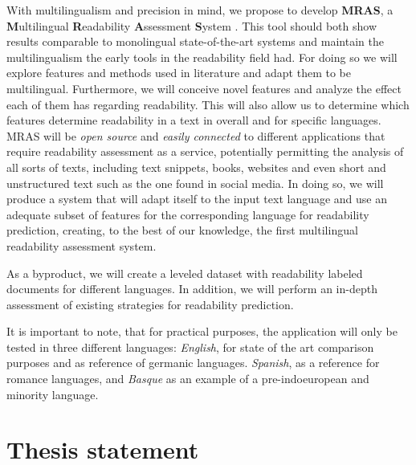 \documentclass[12pt]{article}
\begin{document}
With multilingualism and precision in mind, we propose to develop \textbf{MRAS}, a \textbf{M}ultilingual \textbf{R}eadability \textbf{A}ssessment \textbf{S}ystem . This tool should both show results comparable to monolingual state-of-the-art systems  and  maintain the multilingualism the early tools in the readability field had. For doing so we will explore features and methods used in literature and adapt them to be multilingual. Furthermore, we will conceive novel features and analyze the effect each of them has regarding readability. This will also allow us to determine which features determine readability in a text in overall and for specific languages. MRAS will be \textit{open source} and \textit{easily connected} to different applications that require readability assessment as a service, potentially permitting the analysis of all sorts of texts, including text snippets, books, websites and even short and unstructured text such as the one found in social media. In doing so, we will produce a system that will adapt itself to the input text language and use an adequate subset of features for the corresponding language for readability prediction, creating, to the best of our knowledge, the first multilingual readability assessment system.

As a byproduct, we will create a leveled dataset with readability labeled documents for different languages. In addition, we will perform an in-depth assessment of existing strategies for readability prediction.

It is important to note, that for practical purposes, the application will only be tested in three different languages: \textit{English}, for state of the art comparison purposes and as reference of germanic languages. \textit{Spanish}, as a reference for romance languages, and \textit{Basque} as an example of a pre-indoeuropean and minority language.



\section{Thesis statement}
\end{document}

